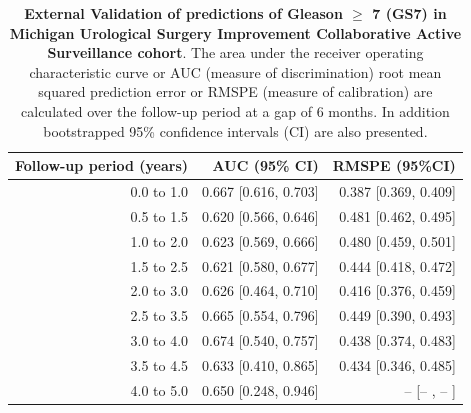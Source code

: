 \begin{table}[!htb]
\small\sf\centering
\caption{\textbf{External Validation of predictions of Gleason $\geq$ 7 (GS7) in Michigan Urological Surgery Improvement Collaborative Active Surveillance cohort}. The area under the receiver operating characteristic curve or AUC (measure of discrimination) root mean squared prediction error or RMSPE (measure of calibration) are calculated over the follow-up period at a gap of 6 months. In addition bootstrapped 95\% confidence intervals (CI) are also presented.}
\label{tab:AUC_PE_MUSIC}
\begin{tabular}{r|r|r}
\hline
\hline
Follow-up period (years) & AUC (95\% CI) & RMSPE (95\%CI)\\ 
\hline
0.0 to 1.0 & 0.667 [0.616, 0.703] & 0.387 [0.369, 0.409]\\
0.5 to 1.5 & 0.620 [0.566, 0.646] & 0.481 [0.462, 0.495]\\
1.0 to 2.0 & 0.623 [0.569, 0.666] & 0.480 [0.459, 0.501]\\
1.5 to 2.5 & 0.621 [0.580, 0.677] & 0.444 [0.418, 0.472]\\
2.0 to 3.0 & 0.626 [0.464, 0.710] & 0.416 [0.376, 0.459]\\
2.5 to 3.5 & 0.665 [0.554, 0.796] & 0.449 [0.390, 0.493]\\
3.0 to 4.0 & 0.674 [0.540, 0.757] & 0.438 [0.374, 0.483]\\
3.5 to 4.5 & 0.633 [0.410, 0.865] & 0.434 [0.346, 0.485]\\
4.0 to 5.0 & 0.650 [0.248, 0.946] & --    [--   , --   ]\\
\hline
\end{tabular}	
\end{table}